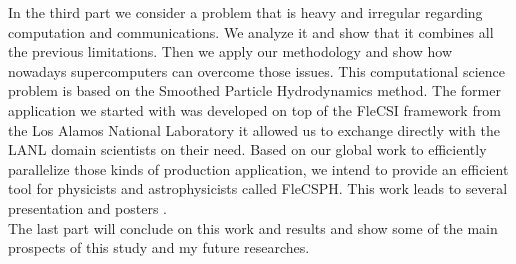 In the third part we consider a problem that is heavy and irregular regarding computation and communications.
We analyze it and show that it combines all the previous limitations. 
Then we apply our methodology and show how nowadays supercomputers can overcome those issues. 
This computational science problem is based on the Smoothed Particle Hydrodynamics method.
The former application we started with was developed on top of the FleCSI framework from the Los Alamos National Laboratory it allowed us to exchange directly with the LANL domain scientists on their need.
Based on our global work to efficiently parallelize those kinds of production application, we intend to provide an efficient tool for physicists and astrophysicists called FleCSPH. 
This work leads to several presentation and posters \cite{debrye20162HOT,loiseau2017SC}.\\

The last part will conclude on this work and results and show some of the main prospects of this study and my future researches.

